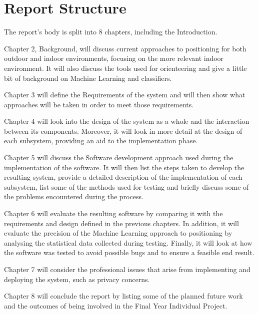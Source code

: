 \documentclass[12pt]{informatics-report}
\begin{document}
\section{Report Structure}
The report’s body is split into 8 chapters, including the Introduction.

Chapter 2, Background, will discuss current approaches to positioning for both outdoor and indoor environments, focusing on the more relevant indoor environment. It will also discuss the tools used for orienteering and give a little bit of background on Machine Learning and classifiers.

Chapter 3 will define the Requirements of the system and will then show what approaches will be taken in order to meet those requirements.

Chapter 4 will look into the design of the system as a whole and the interaction between its components. Moreover, it will look in more detail at the design of each subsystem, providing an aid to the implementation phase.

Chapter 5 will discuss the Software development approach used during the implementation of the software. It will then list the steps taken to develop the resulting system, provide a detailed description of the implementation of each subsystem, list some of the methods used for testing and briefly discuss some of the problems encountered during the process.

Chapter 6 will evaluate the resulting software by comparing it with the requirements and design defined in the previous chapters. In addition, it will evaluate the precision of the Machine Learning approach to positioning by analysing the statistical data collected during testing. Finally, it will look at how the software was tested to avoid possible bugs and to ensure a feasible end result.

Chapter 7 will consider the professional issues that arise from implementing and deploying
the system, such as privacy concerns.

Chapter 8 will conclude the report by listing some of the planned future work and the
outcomes of being involved in the Final Year Individual Project.











\end{document}
